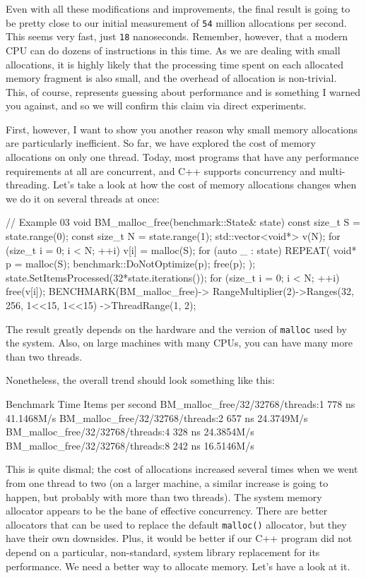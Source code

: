 Even with all these modifications and improvements, the final result is going to be pretty close to our initial measurement of \texttt{54} million allocations per second. This seems very fast, just \texttt{18} nanoseconds. Remember, however, that a modern CPU can do dozens of instructions in this time. As we are dealing with small allocations, it is highly likely that the processing time spent on each allocated memory fragment is also small, and the overhead of allocation is non-trivial. This, of course, represents guessing about performance and is something I warned you against, and so we will confirm this claim via direct experiments.

First, however, I want to show you another reason why small memory allocations are particularly inefficient. So far, we have explored the cost of memory allocations on only one thread. Today, most programs that have any performance requirements at all are concurrent, and C++ supports concurrency and multi-threading. Let's take a look at how the cost of memory allocations changes when we do it on several threads at once:

\begin{code}
// Example 03
void BM_malloc_free(benchmark::State& state) {
  const size_t S = state.range(0);
  const size_t N = state.range(1);
  std::vector<void*> v(N);
  for (size_t i = 0; i < N; ++i) v[i] = malloc(S);
  for (auto _ : state) {
    REPEAT({
      void* p = malloc(S);
      benchmark::DoNotOptimize(p);
      free(p);
    });
  }
  state.SetItemsProcessed(32*state.iterations());
  for (size_t i = 0; i < N; ++i) free(v[i]);
}
BENCHMARK(BM_malloc_free)->
  RangeMultiplier(2)->Ranges({{32, 256}, {1<<15, 1<<15}})
  ->ThreadRange(1, 2);
\end{code}

The result greatly depends on the hardware and the version of \texttt{malloc} used by the system. Also, on large machines with many CPUs, you can have many more than two threads.

Nonetheless, the overall trend should look something like this:

\begin{code}
Benchmark                          Time   Items per second
BM_malloc_free/32/32768/threads:1  778 ns 41.1468M/s
BM_malloc_free/32/32768/threads:2  657 ns 24.3749M/s
BM_malloc_free/32/32768/threads:4  328 ns 24.3854M/s
BM_malloc_free/32/32768/threads:8  242 ns 16.5146M/s
\end{code}

This is quite dismal; the cost of allocations increased several times when we went from one thread to two (on a larger machine, a similar increase is going to happen, but probably with more than two threads). The system memory allocator appears to be the bane of effective concurrency. There are better allocators that can be used to replace the default \texttt{malloc()} allocator, but they have their own downsides. Plus, it would be better if our C++ program did not depend on a particular, non-standard, system library replacement for its performance. We need a better way to allocate memory. Let's have a look at it.

